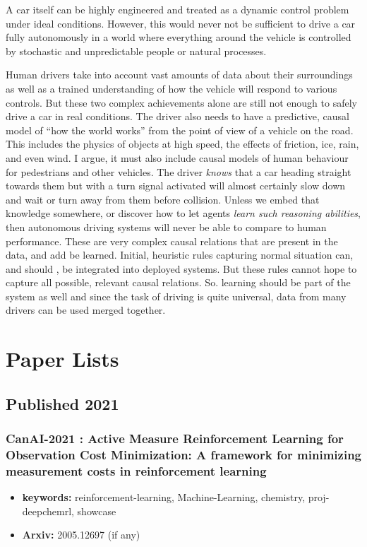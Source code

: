 \documentclass{article}
\begin{document}
A car itself can be highly engineered and treated as a dynamic 
control problem under ideal conditions.
However, this would never not be sufficient to drive a car fully autonomously in a world where everything around the vehicle is controlled by stochastic and unpredictable people or natural processes.

Human drivers take into account vast amounts of data about their surroundings as well as a trained understanding of how the vehicle will respond to various controls. 
But these two complex achievements alone are still not enough to safely drive a car in real conditions. 
The driver also needs to have a predictive, causal model of ``how the world works'' from the point of view of a vehicle on the road. 
This includes the physics of objects at high speed, the effects of friction, ice, rain, and even wind.
I argue, it must also include causal models of human behaviour for pedestrians and other vehicles. 
The driver \textit{knows} that a car heading straight towards them but with a turn signal activated will almost certainly slow down and wait or turn away from them before collision.
Unless we embed that knowledge somewhere, or discover how to let agents \textit{learn such reasoning abilities}, then autonomous driving systems will never be able to compare to human performance.
These are very complex causal relations that are present in the data, and add be learned. 
Initial, heuristic rules capturing normal situation can, and should , be integrated into deployed systems. 
But these rules cannot hope to capture all possible, relevant causal relations. 
So. learning should be part of the system as well and since the task of driving is quite universal, data from many drivers can be used merged together.


\newpage
\section{Paper Lists}
\subsection{Published 2021}
\subsubsection[CANAI-2021 (bellinger2021canai)]{\textbf{CanAI-2021} : Active Measure Reinforcement Learning for Observation Cost Minimization: A framework for minimizing measurement costs in reinforcement learning}
\begin{itemize}
\item \textbf{keywords:} reinforcement-learning, Machine-Learning, chemistry, proj-deepchemrl, showcase
\item \textbf{Arxiv:} 2005.12697 (if any)
\end{itemize}
\end{document}
